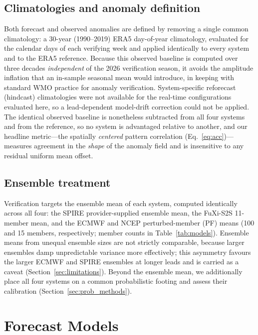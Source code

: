 \documentclass[11pt,a4paper]{article}
\begin{document}
\subsection{Climatologies and anomaly definition}\label{sec:anom}

Both forecast and observed anomalies are defined by removing a single
common climatology: a 30-year (1990--2019) ERA5 day-of-year climatology,
evaluated for the calendar days of each verifying week and applied
identically to every system and to the ERA5 reference. Because this
observed baseline is computed over three decades \emph{independent} of
the 2026 verification season, it avoids the amplitude inflation that an
in-sample seasonal mean would introduce, in keeping with standard WMO
practice for anomaly verification. System-specific reforecast (hindcast)
climatologies were not available for the real-time configurations
evaluated here, so a lead-dependent model-drift correction could not be
applied. The identical observed baseline is nonetheless subtracted from
all four systems and from the reference, so no system is advantaged
relative to another, and our headline metric---the spatially
\emph{centered} pattern correlation (Eq.~\ref{eq:acc})---measures
agreement in the \emph{shape} of the anomaly field and is insensitive to
any residual uniform mean offset.

\subsection{Ensemble treatment}\label{sec:ens}

Verification targets the ensemble mean of each system, computed
identically across all four: the SPIRE provider-supplied ensemble mean,
the FuXi-S2S 11-member mean, and the ECMWF and NCEP perturbed-member
(PF) means (100 and 15 members, respectively; member counts in
Table~\ref{tab:models}). Ensemble means from unequal ensemble sizes are
not strictly comparable, because larger ensembles damp unpredictable
variance more effectively; this asymmetry favours the larger ECMWF and
SPIRE ensembles at longer leads and is carried as a caveat
(Section~\ref{sec:limitations}). Beyond the ensemble mean, we
additionally place all four systems on a common probabilistic footing
and assess their calibration (Section~\ref{sec:prob_methods}).

\section{Forecast Models}\label{sec:models}
\end{document}
